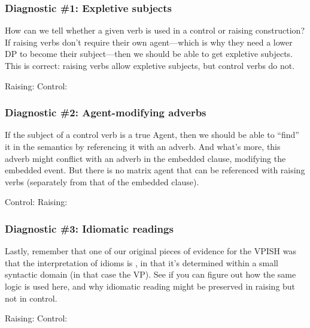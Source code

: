 \documentclass{article}
\begin{document}
    \subsubsection{Diagnostic \#1: Expletive subjects}
How can we tell whether a given verb is used in a control or raising construction? If raising verbs don't require their own agent---which is why they need a lower DP to become their subject---then we should be able to get expletive subjects. This is correct: raising verbs allow expletive subjects, but control verbs do not.

\ea Raising:
    \z
\ex Control:
    \z
\z

    \subsubsection{Diagnostic \#2: Agent-modifying adverbs}
If the subject of a control verb is a true Agent, then we should be able to ``find'' it in the semantics by referencing it with an adverb. And what's more, this adverb might conflict with an adverb in the embedded clause, modifying the embedded event. But there is no matrix agent that can be referenced with raising verbs (separately from that of the embedded clause).

\ea Control:
    \z
\ex Raising:
    \z
\z

    \subsubsection{Diagnostic \#3: Idiomatic readings}
Lastly, remember that one of our original pieces of evidence for the VPISH was that the interpretation of idioms is , in that it's determined within a small syntactic domain (in that case the VP). See if you can figure out how the same logic is used here, and why idiomatic reading might be preserved in raising but not in control.

\ea Raising:
    \z
\ex Control:
    \z
\z

\printbibliography
\end{document}
